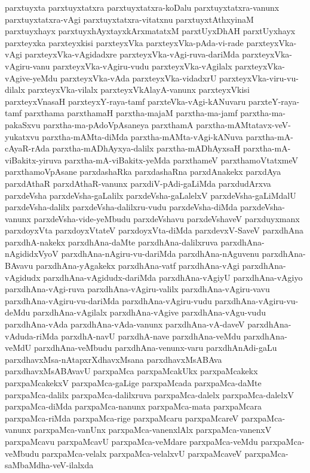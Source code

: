 {parxtuyxta
parxtuyxtatxra
parxtuyxtatxra-koDalu
parxtuyxtatxra-vanunx
parxtuyxtatxra-vAgi
parxtuyxtatxra-vitatxnu
parxtuyxtAthxyinaM
parxtuyxhayx
parxtuyxhAyxtayxkArxmatatxM
parxtUyxDhAH
parxtUyxhayx
parxteyxka
parxteyxkisi
parxteyxVka
parxteyxVka-pAda-vi-rade
parxteyxVka-vAgi
parxteyxVka-vAgidadxre
parxteyxVka-vAgi-ruva-dariMda
parxteyxVka-vAgiru-vanu
parxteyxVka-vAgiru-vudu
parxteyxVka-vAgilalx
parxteyxVka-vAgive-yeMdu
parxteyxVka-vAda
parxteyxVka-vidadxrU
parxteyxVka-viru-vu-dilalx
parxteyxVka-vilalx
parxteyxVkAlayA-vanunx
parxteyxVkisi
parxteyxVnasaH
parxteyxY-raya-tamf
parxteVka-vAgi-kANuvaru
parxteY-raya-tamf
parxthama
parxthamaH
parxtha-majaM
parxtha-ma-jamf
parxtha-ma-pakaSxvu
parxtha-ma-pAdoVpAsaneya
parxthamA
parxtha-mAMtatavx-veV-yukatxvu
parxtha-mAMta-diMda
parxtha-mAMta-vAgi-kANuva
parxtha-mA-cAyaR-rAda
parxtha-mADhAyxya-dalilx
parxtha-mADhAyxsaH
parxtha-mA-viBakitx-yiruva
parxtha-mA-viBakitx-yeMda
parxthameV
parxthamoVtatxmeV
parxthamoVpAsane
parxdashaRka
parxdashaRna
parxdAnakekx
parxdAya
parxdAthaR
parxdAthaR-vanunx
parxdiV-pAdi-gaLiMda
parxdudArxva
parxdeVsha
parxdeVsha-gaLalilx
parxdeVsha-gaLalelxV
parxdeVsha-gaLiMdalU
parxdeVsha-dalilx
parxdeVsha-dalilxru-vudu
parxdeVsha-diMda
parxdeVsha-vanunx
parxdeVsha-vide-yeMbudu
parxdeVshavu
parxdeVshaveV
parxduyxmanx
parxdoyxVta
parxdoyxVtateV
parxdoyxVta-diMda
parxdevxV-SaveV
parxdhAna
parxdhA-nakekx
parxdhAna-daMte
parxdhAna-dalilxruva
parxdhAna-nAgididxVyoV
parxdhAna-nAgiru-vu-dariMda
parxdhAna-nAguvenu
parxdhAna-BAvavu
parxdhAna-yAgakekx
parxdhAna-vatf
parxdhAna-vAgi
parxdhAna-vAgidudx
parxdhAna-vAgidudx-dariMda
parxdhAna-vAgiyU
parxdhAna-vAgiyo
parxdhAna-vAgi-ruva
parxdhAna-vAgiru-valilx
parxdhAna-vAgiru-vavu
parxdhAna-vAgiru-vu-dariMda
parxdhAna-vAgiru-vudu
parxdhAna-vAgiru-vu-deMdu
parxdhAna-vAgilalx
parxdhAna-vAgive
parxdhAna-vAgu-vudu
parxdhAna-vAda
parxdhAna-vAda-vanunx
parxdhAna-vA-daveV
parxdhAna-vAduda-riMda
parxdhA-navU
parxdhA-nave
parxdhAna-veMdu
parxdhAna-veMdU
parxdhAna-veMbudu
parxdhAna-venunx-varu
parxdhAnAdi-gaLu
parxdhavxMsa-nAtapxrXdhavxMsana
parxdhavxMsABAva
parxdhavxMsABAvavU
parxpaMca
parxpaMcakUkx
parxpaMcakekx
parxpaMcakekxV
parxpaMca-gaLige
parxpaMcada
parxpaMca-daMte
parxpaMca-dalilx
parxpaMca-dalilxruva
parxpaMca-dalelx
parxpaMca-dalelxV
parxpaMca-diMda
parxpaMca-nanunx
parxpaMca-mata
parxpaMcara
parxpaMca-riMda
parxpaMca-rige
parxpaMcaru
parxpaMcareV
parxpaMca-vanunx
parxpaMca-vanUnx
parxpaMca-vanenxlAlx
parxpaMca-vanenxV
parxpaMcavu
parxpaMcavU
parxpaMca-veMdare
parxpaMca-veMdu
parxpaMca-veMbudu
parxpaMca-velalx
parxpaMca-velalxvU
parxpaMcaveV
parxpaMca-saMbaMdha-veV-ilalxda
}
